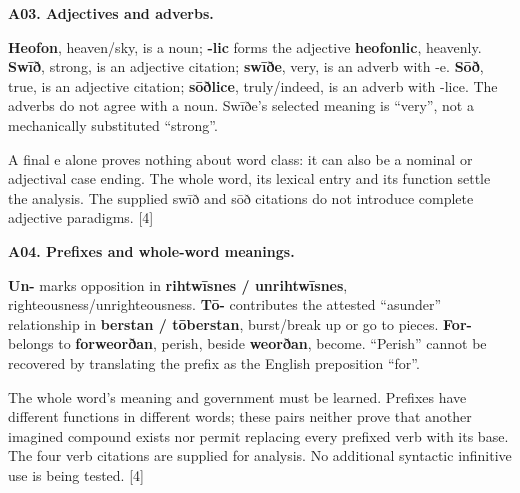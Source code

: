 \par\begin{minipage}{\linewidth}\raggedright
\textbf{A03. Adjectives and adverbs.}

\textbf{Heofon}, heaven/\allowbreak{}sky, is a noun; \textbf{-lic} forms the adjective \textbf{heofonlic}, heavenly. \textbf{Swīð}, strong, is an adjective citation; \textbf{swīðe}, very, is an adverb with -e. \textbf{Sōð}, true, is an adjective citation; \textbf{sōðlice}, truly/\allowbreak{}indeed, is an adverb with -lice. The adverbs do not agree with a noun. Swīðe's selected meaning is “very”, not a mechanically substituted “strong”.

A final e alone proves nothing about word class: it can also be a nominal or adjectival case ending. The whole word, its lexical entry and its function settle the analysis. The supplied swīð and sōð citations do not introduce complete adjective paradigms. [4]

\end{minipage}\par\addvspace{4pt}

\par\begin{minipage}{\linewidth}\raggedright
\textbf{A04. Prefixes and whole-word meanings.}

\textbf{Un-} marks opposition in \textbf{rihtwīsnes /\allowbreak{} unrihtwīsnes}, righteousness/\allowbreak{}unrighteousness. \textbf{Tō-} contributes the attested “asunder” relationship in \textbf{berstan /\allowbreak{} tōberstan}, burst/\allowbreak{}break up or go to pieces. \textbf{For-} belongs to \textbf{forweorðan}, perish, beside \textbf{weorðan}, become. “Perish” cannot be recovered by translating the prefix as the English preposition “for”.

The whole word's meaning and government must be learned. Prefixes have different functions in different words; these pairs neither prove that another imagined compound exists nor permit replacing every prefixed verb with its base. The four verb citations are supplied for analysis. No additional syntactic infinitive use is being tested. [4]

\end{minipage}\par\addvspace{4pt}

